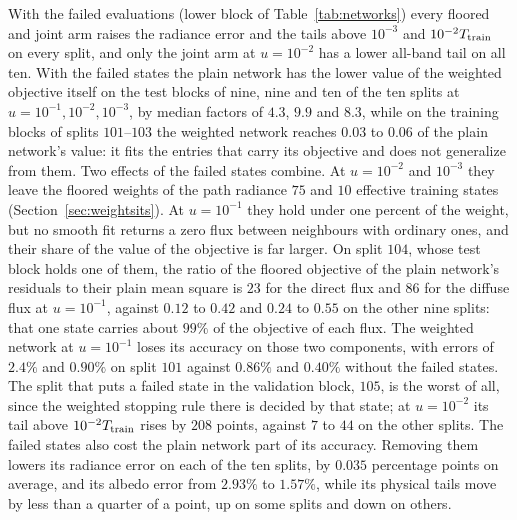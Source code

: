 \documentclass[11pt]{article}
\theoremstyle{remark}
\newcommand{\1}{\mathbf{1}}
\begin{document}
With the failed evaluations (lower block of Table~\ref{tab:networks}) every floored and joint arm raises the radiance error and the tails above
$10^{-3}$ and $10^{-2}T_{\rm train}$ on every split, and only the joint arm at $u=10^{-2}$ has a lower all-band tail on
all ten. With the failed states the plain network has the lower value of the weighted objective itself on the test blocks
of nine, nine and ten of the ten splits at $u=10^{-1},10^{-2},10^{-3}$, by median factors of $4.3$, $9.9$ and $8.3$,
while on the training blocks of splits $101$--$103$ the weighted network reaches $0.03$ to $0.06$ of the plain network's
value: it fits the entries that carry its objective and does not generalize from them. Two effects of the failed states combine. At
$u=10^{-2}$ and $10^{-3}$ they leave the floored weights of the path radiance $75$ and $10$ effective training states
(Section~\ref{sec:weightsits}). At $u=10^{-1}$ they hold under one percent of the weight, but no smooth fit returns a zero
flux between neighbours with ordinary ones, and their share of the value of the objective is far larger. On split
$104$, whose test block holds one of them, the ratio of the floored objective of the plain network's residuals to their
plain mean square is $23$ for the direct flux and $86$ for the diffuse flux at $u=10^{-1}$, against $0.12$ to $0.42$ and
$0.24$ to $0.55$ on the other nine splits: that one state carries about $99\%$ of the objective of each flux. The
weighted network at $u=10^{-1}$ loses its accuracy on those two components, with errors of $2.4\%$ and $0.90\%$ on split
$101$ against $0.86\%$ and $0.40\%$ without the failed states. The split that puts a failed state in the validation block,
$105$, is the worst of all, since the weighted stopping rule there is decided by that state; at $u=10^{-2}$ its tail
above $10^{-2}T_{\rm train}$ rises by $208$ points, against $7$ to $44$ on the other splits. The failed states also cost
the plain network part of its accuracy. Removing them lowers its radiance error on each of the ten splits, by $0.035$
percentage points on average, and its albedo error from $2.93\%$ to $1.57\%$, while its physical tails move by less
than a quarter of a point, up on some splits and down on others.
\end{document}
